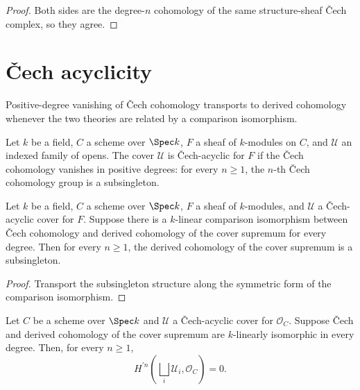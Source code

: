 \begin{proof}
  \leanok
  Both sides are the degree-\(n\) cohomology of the same structure-sheaf \v{C}ech complex, so they agree.
\end{proof}

\section{\v{C}ech acyclicity}
\label{sec:moduleK_cech_acyclic_cover}

Positive-degree vanishing of \v{C}ech cohomology transports to derived cohomology whenever the two theories are related by a comparison isomorphism.

\begin{definition}\leanok
  \label{def:Scheme_IsCechAcyclicCover}

  Let \(k\) be a field, \(C\) a scheme over \(\Spec k\), \(F\) a sheaf of \(k\)-modules on \(C\), and \(\mathcal U\) an indexed family of opens. The cover \(\mathcal U\) is \v{C}ech-acyclic for \(F\) if the \v{C}ech cohomology vanishes in positive degrees: for every \(n \ge 1\), the \(n\)-th \v{C}ech cohomology group is a subsingleton.
\end{definition}

\begin{theorem}\leanok
  \label{thm:Scheme_subsingleton_HModule_prime_supr_of_isCechAcyclicCover}

  Let \(k\) be a field, \(C\) a scheme over \(\Spec k\), \(F\) a sheaf of \(k\)-modules, and \(\mathcal U\) a \v{C}ech-acyclic cover for \(F\). Suppose there is a \(k\)-linear comparison isomorphism between \v{C}ech cohomology and derived cohomology of the cover supremum for every degree. Then for every \(n \ge 1\), the derived cohomology of the cover supremum is a subsingleton.
\end{theorem}

\begin{proof}

  \leanok
  Transport the subsingleton structure along the symmetric form of the comparison isomorphism.
\end{proof}

\begin{theorem}\leanok
  \label{thm:Scheme_subsingleton_HModule_prime_supr_of_isCechAcyclicCover_curve}

  Let \(C\) be a scheme over \(\Spec k\) and \(\mathcal U\) a \v{C}ech-acyclic cover for \(\mathcal O_C\). Suppose \v{C}ech and derived cohomology of the cover supremum are \(k\)-linearly isomorphic in every degree. Then, for every \(n\geq 1\),
  \[
    H^{\prime n}\!\left(\bigsqcup_i \mathcal U_i,\mathcal O_C\right)=0.
  \]
\end{theorem}


